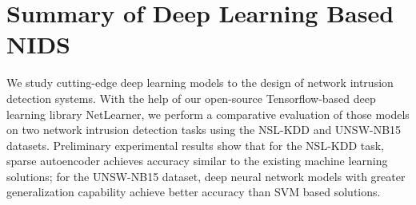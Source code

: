 \section{Summary of Deep Learning Based NIDS}

We study cutting-edge deep learning models to the design of network intrusion detection systems.
With the help of our open-source Tensorflow-based deep learning library NetLearner,
we perform a comparative evaluation of those models on two network intrusion detection tasks using the NSL-KDD and UNSW-NB15 datasets.
Preliminary experimental results show that for the NSL-KDD task, sparse autoencoder achieves accuracy similar to the existing machine learning solutions;
for the UNSW-NB15 dataset, deep neural network models with greater generalization capability achieve better accuracy than SVM based solutions.

